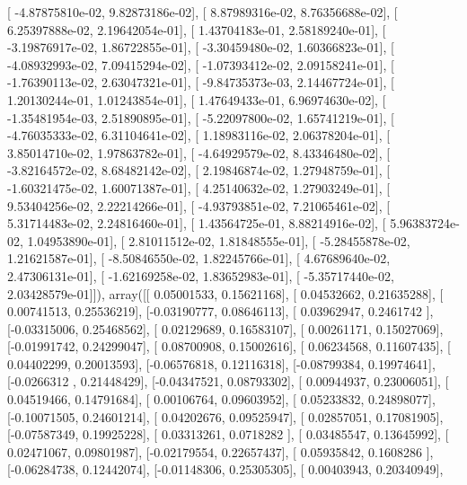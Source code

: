 \documentclass{article}
\begin{document}
       [ -4.87875810e-02,   9.82873186e-02],
       [  8.87989316e-02,   8.76356688e-02],
       [  6.25397888e-02,   2.19642054e-01],
       [  1.43704183e-01,   2.58189240e-01],
       [ -3.19876917e-02,   1.86722855e-01],
       [ -3.30459480e-02,   1.60366823e-01],
       [ -4.08932993e-02,   7.09415294e-02],
       [ -1.07393412e-02,   2.09158241e-01],
       [ -1.76390113e-02,   2.63047321e-01],
       [ -9.84735373e-03,   2.14467724e-01],
       [  1.20130244e-01,   1.01243854e-01],
       [  1.47649433e-01,   6.96974630e-02],
       [ -1.35481954e-03,   2.51890895e-01],
       [ -5.22097800e-02,   1.65741219e-01],
       [ -4.76035333e-02,   6.31104641e-02],
       [  1.18983116e-02,   2.06378204e-01],
       [  3.85014710e-02,   1.97863782e-01],
       [ -4.64929579e-02,   8.43346480e-02],
       [ -3.82164572e-02,   8.68482142e-02],
       [  2.19846874e-02,   1.27948759e-01],
       [ -1.60321475e-02,   1.60071387e-01],
       [  4.25140632e-02,   1.27903249e-01],
       [  9.53404256e-02,   2.22214266e-01],
       [ -4.93793851e-02,   7.21065461e-02],
       [  5.31714483e-02,   2.24816460e-01],
       [  1.43564725e-01,   8.88214916e-02],
       [  5.96383724e-02,   1.04953890e-01],
       [  2.81011512e-02,   1.81848555e-01],
       [ -5.28455878e-02,   1.21621587e-01],
       [ -8.50846550e-02,   1.82245766e-01],
       [  4.67689640e-02,   2.47306131e-01],
       [ -1.62169258e-02,   1.83652983e-01],
       [ -5.35717440e-02,   2.03428579e-01]]), array([[ 0.05001533,  0.15621168],
       [ 0.04532662,  0.21635288],
       [ 0.00741513,  0.25536219],
       [-0.03190777,  0.08646113],
       [ 0.03962947,  0.2461742 ],
       [-0.03315006,  0.25468562],
       [ 0.02129689,  0.16583107],
       [ 0.00261171,  0.15027069],
       [-0.01991742,  0.24299047],
       [ 0.08700908,  0.15002616],
       [ 0.06234568,  0.11607435],
       [ 0.04402299,  0.20013593],
       [-0.06576818,  0.12116318],
       [-0.08799384,  0.19974641],
       [-0.0266312 ,  0.21448429],
       [-0.04347521,  0.08793302],
       [ 0.00944937,  0.23006051],
       [ 0.04519466,  0.14791684],
       [ 0.00106764,  0.09603952],
       [ 0.05233832,  0.24898077],
       [-0.10071505,  0.24601214],
       [ 0.04202676,  0.09525947],
       [ 0.02857051,  0.17081905],
       [-0.07587349,  0.19925228],
       [ 0.03313261,  0.0718282 ],
       [ 0.03485547,  0.13645992],
       [ 0.02471067,  0.09801987],
       [-0.02179554,  0.22657437],
       [ 0.05935842,  0.1608286 ],
       [-0.06284738,  0.12442074],
       [-0.01148306,  0.25305305],
       [ 0.00403943,  0.20340949],
\end{document}
